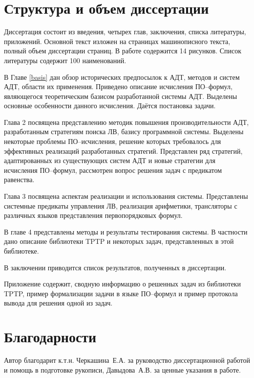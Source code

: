 \section*{Структура и объем диссертации}
Диссертация состоит из введения, четырех глав, заключения, списка литературы, приложений. Основной текст изложен на \pageref{pg:main} страницах машинописного текста, полный объем диссертации \pageref{pg:total} страниц. В работе содержится 14 рисунков. Список литературы содержит 100 наименований.

В Главе \ref{basis} дан обзор исторических предпосылок к АДТ, методов и систем АДТ, области их применения. Приведено описание исчисления ПО--формул, являющегося теоретическим базисом разработанной системы АДТ. Выделены основные особенности данного исчисления. Даётся постановка задачи.

Глава 2 посвящена представлению методик повышения производительности АДТ, разработанным стратегиям поиска ЛВ, базису программной системы. Выделены некоторые проблемы ПО--исчисления, решение которых требовалось для эффективных реализаций разработанных стратегий. Представлен ряд стратегий, адаптированных из существующих систем АДТ и новые стратегии для исчисления ПО--формул, рассмотрен вопрос решения задач с предикатом равенства.

Глава 3 посвящена аспектам реализации и использования системы. Представлены системные предикаты управления ЛВ, реализация арифметики, трансляторы с различных языков представления первопорядковых формул.

В главе 4 представлены методы и результаты тестирования системы. В частности дано описание библиотеки TPTP и некоторых задач, представленных в этой библиотеке. %

В заключении приводится список результатов, полученных в диссертации. %

Приложение содержит, сводную информацию о решенных задач из библиотеки TPTP, пример формализации задачи в языке ПО--формул и пример протокола вывода для решения одной из задач.



\section*{Благодарности}
Автор благодарит к.т.н. Черкашина~Е.А. за руководство диссертационной работой и помощь в подготовке рукописи, Давыдова~А.В. за ценные указания в работе.


